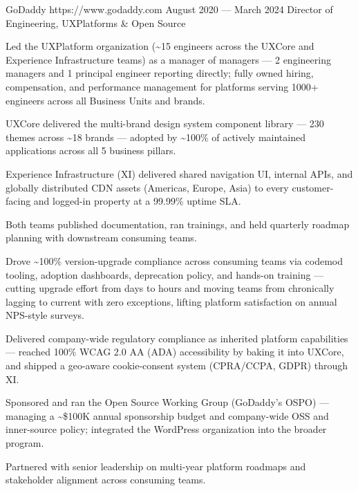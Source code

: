 \documentclass{resume}
\begin{document}
\employer
{GoDaddy}
{https://www.godaddy.com}
{August 2020 --- March 2024}
{Director of Engineering, UXPlatforms \& Open Source }
{
  \begin{jobitems}
  \item Led the UXPlatform organization (\textasciitilde15 engineers across the UXCore and Experience Infrastructure teams) as a manager of managers --- 2 engineering managers and 1 principal engineer reporting directly; fully owned hiring, compensation, and performance management for platforms serving 1000+ engineers across all Business Units and brands.
    \begin{jobitems}
    \item UXCore delivered the multi-brand design system component library --- 230 themes across \textasciitilde18 brands --- adopted by \textasciitilde100\% of actively maintained applications across all 5 business pillars.
    \item Experience Infrastructure (XI) delivered shared navigation UI, internal APIs, and globally distributed CDN assets (Americas, Europe, Asia) to every customer-facing and logged-in property at a 99.99\% uptime SLA.
    \item Both teams published documentation, ran trainings, and held quarterly roadmap planning with downstream consuming teams.
    \end{jobitems}
  \item Drove \textasciitilde100\% version-upgrade compliance across consuming teams via codemod tooling, adoption dashboards, deprecation policy, and hands-on training --- cutting upgrade effort from days to hours and moving teams from chronically lagging to current with zero exceptions, lifting platform satisfaction on annual NPS-style surveys.
  \item Delivered company-wide regulatory compliance as inherited platform capabilities --- reached 100\% WCAG 2.0 AA (ADA) accessibility by baking it into UXCore, and shipped a geo-aware cookie-consent system (CPRA/CCPA, GDPR) through XI.
  \item Sponsored and ran the Open Source Working Group (GoDaddy's OSPO) --- managing a \textasciitilde\$100K annual sponsorship budget and company-wide OSS and inner-source policy; integrated the WordPress organization into the broader program.
  \item Partnered with senior leadership on multi-year platform roadmaps and stakeholder alignment across consuming teams.
\end{jobitems}}
\end{document}
